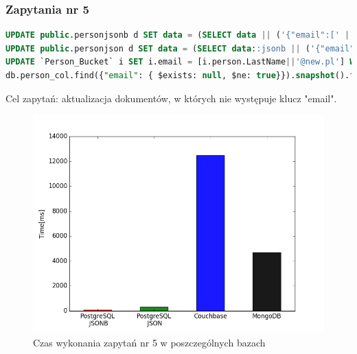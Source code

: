 \documentclass[a4paper,12pt,table]{article}
\begin{document}
{\subsubsection{Zapytania nr 5}
\begin{lstlisting}[language=SQL,basicstyle=\footnotesize]
UPDATE public.personjsonb d SET data = (SELECT data || ('{"email":[' || quote_ident(dd.data->'person'->>'LastName'||'@hotmail.com')||']}')::jsonb  FROM public.personjsonb dd  WHERE d."ObjectID"=dd."ObjectID") WHERE not d.data ? 'email';
UPDATE public.personjson d SET data = (SELECT data::jsonb || ('{"email":[' || quote_ident(dd.data->'person'->>'LastName'||'@hotmail.com')||']}')::jsonb  FROM public.personjson dd  WHERE d."ObjectID"=dd."ObjectID")::json WHERE not d.data::jsonb ? 'email';
UPDATE `Person_Bucket` i SET i.email = [i.person.LastName||'@new.pl'] WHERE email IS MISSING;
db.person_col.find({"email": { $exists: null, $ne: true}}).snapshot().forEach( function (elem) {db.person_col.update({_id: elem._id },{ $set:{'email': [ elem.LastName +'@new.com']}});});
\end{lstlisting}
\vspace{0.5cm}
Cel zapytań: aktualizacja dokumentów, w których nie występuje klucz "email".

\begin{figure}[h]
\begin{center}
\includegraphics[scale=0.5]{ax/fig5}
\end{center}
\caption{Czas wykonania zapytań nr 5 w poszczególnych bazach}
\end{figure}

}
\end{document}
